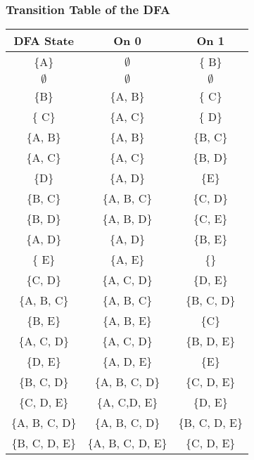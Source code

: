 \documentclass[8pt]{article}
\begin{document}
\subsubsection{Transition Table of the DFA}
\begin{table}[H]
    \centering
    \renewcommand{\arraystretch}{1.3} %
    \begin{tabular}{|c|c|c|}
        \hline
        \rowcolor{gray!20} %
        \textbf{DFA State} & \textbf{On 0} & \textbf{On 1} \\
        \hline
        \{A\} & $\emptyset$
 & \{ B\} \\
        \hline
        $\emptyset$ & $\emptyset$
 & $\emptyset$ \\
        \hline
        \{B\} & \{A, B\} & \{ C\} \\
        \hline
        \{ C\} & \{A, C\} & \{ D\} \\
        \hline
        \{A, B\} & \{A, B\} & \{B, C\} \\
        \hline
        \{A, C\} & \{A, C\} & \{B, D\} \\
        \hline
        \{D\} & \{A, D\} & \{E\} \\
        \hline
        \{B, C\} & \{A, B, C\} & \{C, D\} \\
        \hline
        \{B, D\} & \{A, B, D\} & \{C, E\} \\
        \hline
        \{A, D\} & \{A, D\} & \{B, E\} \\
        \hline
        \{ E\} & \{A, E\} & \{\} \\
        \hline
        \{C, D\} & \{A, C, D\} & \{D, E\} \\
        \hline
        \{A, B, C\} & \{A, B, C\} & \{B, C, D\} \\
        \hline
        \{B, E\} & \{A, B, E\} & \{C\} \\
        \hline
        \{A, C, D\} & \{A, C, D\} & \{B, D, E\} \\
        \hline
        \{D, E\} & \{A, D, E\} & \{E\} \\
        \hline
        \{B, C, D\} & \{A, B, C, D\} & \{C, D, E\} \\
        \hline
        \{C, D, E\} & \{A, C,D, E\} & \{D, E\} \\
        \hline
        \{A, B, C, D\} & \{A, B, C, D\} & \{B, C, D, E\} \\
        \hline
        \{B, C, D, E\} & \{A, B, C, D, E\} & \{C, D, E\} \\

\end{tabular}
\end{table}
\end{document}
